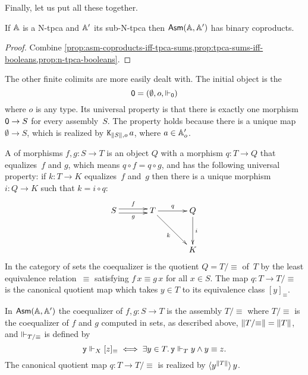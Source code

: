 \noindent
Finally, let us put all these together.

\begin{proposition}
  If $\AA$ is a N-tpca and $\subAA$ its sub-N-tpca then $\AsmA$ has
  binary coproducts.
\end{proposition}

\begin{proof}
  Combine \cref{prop:asm-coproducts-iff-tpca-sums,prop:tpca-sums-iff-booleans,prop:n-tpca-booleans}.
\end{proof}

The other finite colimits are more easily dealt with. The initial
object is the 
%
\begin{equation*}
  \zero = (\emptyset, o, \rz[\zero])
\end{equation*}
%
where $o$ is any type. Its universal property is that there is exactly one
morphism $\zero \to S$ for every assembly~$S$. The
property holds because there is a unique map $\emptyset \to S$, which
is realized by $\combK_{\T{S},o}\,a$, where $a \in \subAtyp{o}$.

A  of morphisms $f, g : S \to T$ is an object $Q$
with a morphism $q : T \to Q$ that equalizes~$f$ and $g$, which means
$q \circ f = q \circ g$, and has the following universal property: if
$k : T \to K$ equalizes~$f$ and~$g$ then there is a unique morphism $i
: Q \to K$ such that $k = i \circ q$:
%
\begin{equation*}
  \xymatrix@+1em{
    {S}
    \ar@<+0.25em>[r]^{f}
    \ar@<-0.25em>[r]_{g}
    &
    {T}
    \ar[rd]_{k}
    \ar[r]^{q}
    &
    {Q}
    \ar[d]^{i}
    \\
    & & 
    {K}
  }
\end{equation*}
%
In the category of sets the coequalizer is the quotient $Q =
T/{\equiv}$ of~$T$ by the least equivalence relation~$\equiv$
satisfying $f\,x \equiv g\,x$ for all $x \in S$. The map $q : T \to
T/{\equiv}$ is the canonical quotient map which takes $y \in T$ to its
equivalence class $[y]_{\equiv}$.

In $\AsmA$ the coequalizer of $f, g : S \to T$ is the
assembly $T/{\equiv}$ where $T/{\equiv}$ is the coequalizer of
$f$ and $g$ computed in sets, as described above, $\T{T/{\equiv}}
= \T{T}$, and $\rz[T/{\equiv}]$ is defined by
%
\begin{equation*}
  \R{y} \rz[X] [z]_{\equiv} \iff
  \some{y \in T} \R{y} \rz[T] y \land y \equiv z.
\end{equation*}
%
The canonical quotient map $q : T \to T/{\equiv}$ is realized by
$\tpcalam{y}{\T{T}} y$.

